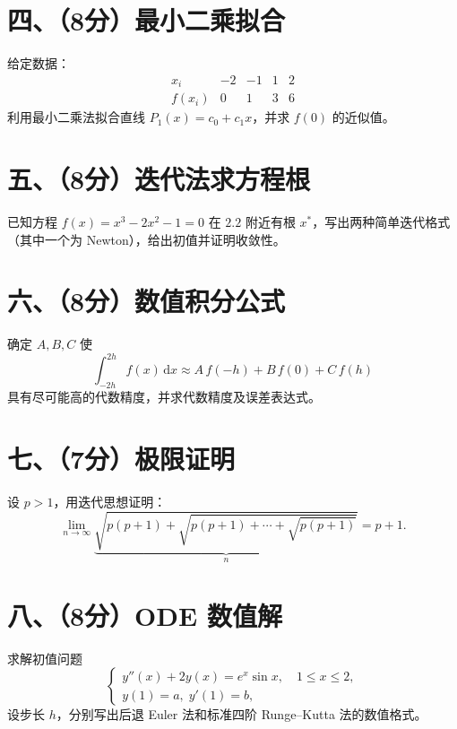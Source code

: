 \documentclass[12pt,a4paper]{article}
\begin{document}
	\vspace{20cm}
	
	\newpage
	\section*{四、（8分）最小二乘拟合}
	给定数据：
	\[
	\begin{array}{c|cccc}
		x_i & -2 & -1 & 1 & 2\\\hline
		f(x_i) & 0 & 1 & 3 & 6
	\end{array}
	\]
	利用最小二乘法拟合直线 $P_1(x)=c_0+c_1x$，并求 $f(0)$ 的近似值。
	
	\vspace{20cm}
	
	\newpage
	\section*{五、（8分）迭代法求方程根}
	已知方程 $f(x)=x^3-2x^2-1=0$ 在 $2.2$ 附近有根 $x^*$，写出两种简单迭代格式（其中一个为 Newton），给出初值并证明收敛性。
	
	\vspace{20cm}
	
	\newpage
	\section*{六、（8分）数值积分公式}
	确定 $A,B,C$ 使
	\[
	\int_{-2h}^{2h} f(x)\,\mathrm{d}x
	\approx A\,f(-h) + B\,f(0) + C\,f(h)
	\]
	具有尽可能高的代数精度，并求代数精度及误差表达式。
	
	\vspace{20cm}
	
	\newpage
	\section*{七、（7分）极限证明}
	设 $p>1$，用迭代思想证明：
	\[
	\lim_{n\to\infty}
	\underbrace{\sqrt{p(p+1)+\sqrt{p(p+1)+\cdots+\sqrt{p(p+1)}}}}
	_{n}
	= p+1.
	\]
	
	\vspace{20cm}
	
	\newpage
	\section*{八、（8分）ODE 数值解}
	求解初值问题
	\[
	\begin{cases}
		y''(x) + 2y(x) = e^x\sin x,\quad 1\le x\le2,\\
		y(1)=a,\;y'(1)=b,
	\end{cases}
	\]
	设步长 $h$，分别写出后退 Euler 法和标准四阶 Runge--Kutta 法的数值格式。
	
	\vspace{20cm}
	
\end{document}
